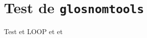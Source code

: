 \documentclass[PhD,nohyperref,english,french]{ulthese}
\begin{document}
\frontmatter                    %

\pagetitre

\tableofcontents

\begin{SingleSpace}
\abnormalparskip{0pt}
\printglossary[title=Nomenclature]
\label{chap.nomenclature}
\end{SingleSpace}
\cleardoublepage


\mainmatter                     %

\chapter{Test de \texttt{glosnomtools}}

Test  et \gls{LOOP} et  et 
\end{document}
